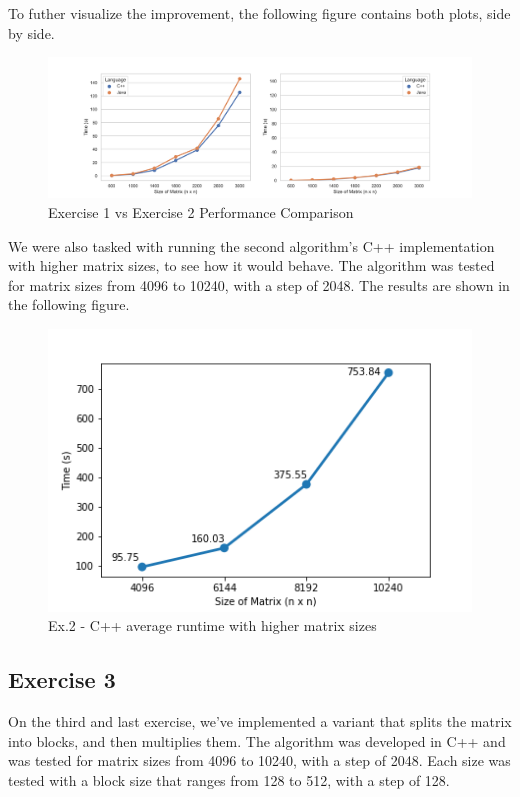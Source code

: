 \documentclass[10pt, titlepage]{extarticle}
\begin{document}
To futher visualize the improvement, the following figure contains both plots, side by side.
\begin{figure}[H]
    \centering
    \includegraphics[width=.9\linewidth]{../plots/ex1-ex2a-overall.png}
    \caption{Exercise 1 vs Exercise 2 Performance Comparison}
    \label{ex2-overall2}
\end{figure}


\vspace*{20px}

We were also tasked with running the second algorithm's C++ implementation with higher matrix sizes, to see how it would behave.
The algorithm was tested for matrix sizes from 4096 to 10240, with a step of 2048. The results are shown in the following figure.

\begin{figure}[H]
    \centering
    \includegraphics[width=0.5\linewidth]{../plots/ex2/ex2_higher.png}
    \caption{Ex.2 - C++ average runtime with higher matrix sizes}
\end{figure}

\subsection{Exercise 3}\label{Exercise 3}

On the third and last exercise, we've implemented a variant that splits the matrix into blocks, and then multiplies them.
The algorithm was developed in C++ and was tested for matrix sizes from 4096 to 10240, with a step of 2048.
Each size was tested with a block size that ranges from 128 to 512, with a step of 128.
\end{document}
